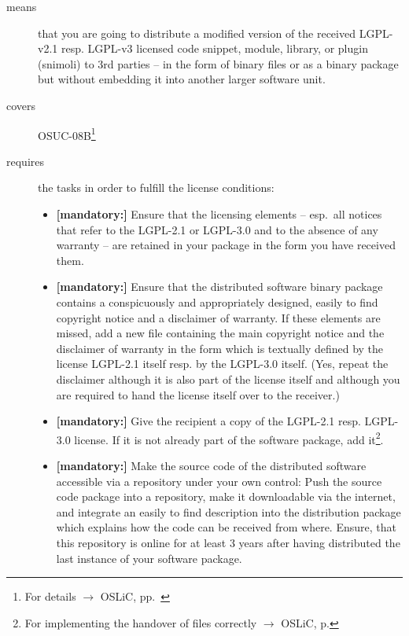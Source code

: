 \begin{description}
\item[means] that you are going to distribute a modified version of the received
LGPL-v2.1 resp. LGPL-v3 licensed code snippet, module, library, or plugin
(snimoli) to 3rd parties -- in the form of binary files or as a binary package
but without embedding it into another larger software unit.
\item[covers] OSUC-08B\footnote{For details $\rightarrow$ OSLiC, pp.\ \pageref{OSUC-08-DEF}}
\item[requires] the tasks in order to fulfill the license conditions:
\begin{itemize}

  \item \textbf{[mandatory:]} Ensure that the licensing elements -- esp.\ all
  notices that refer to the LGPL-2.1 or LGPL-3.0 and to the absence of any
  warranty -- are retained in your package in the form you have received them.

  \item \textbf{[mandatory:]} Ensure that the distributed software binary
  package contains a conspicuously and appropriately designed, easily to find
  copyright notice and a disclaimer of warranty. If these elements are missed,
  add a new file containing the main copyright notice and the disclaimer of
  warranty in the form which is textually defined by the license LGPL-2.1 itself
  resp. by the LGPL-3.0 itself. (Yes, repeat the disclaimer although it is also
  part of the license itself and although you are required to hand the license
  itself over to the receiver.)
  
  \item \textbf{[mandatory:]} Give the recipient a copy of the LGPL-2.1 resp.
  LGPL-3.0 license. If it is not already part of the software package, add
  it\footnote{For implementing the handover of files correctly $\rightarrow$
  OSLiC, p. \pageref{DistributingFilesHint}}.

  \item \textbf{[mandatory:]} Make the source code of the distributed software
  accessible via a repository under your own control: Push the source code
  package into a repository, make it downloadable via the internet, and
  integrate an easily to find description into the distribution package which
  explains how the code can be received from where. Ensure, that this repository
  is online for at least 3 years after having distributed the last instance
  of your software package.
  

\end{itemize}
\end{description}
